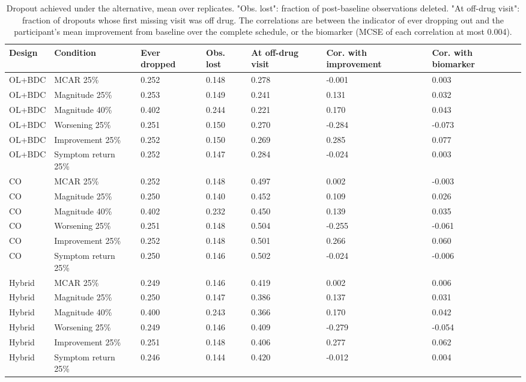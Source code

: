 \documentclass[
  11pt,
]{article}
\begin{document}
\begin{table}

\caption{\label{tab:tab-dropout}Dropout achieved under the alternative, mean over replicates. "Obs. lost": fraction of post-baseline observations deleted. "At off-drug visit": fraction of dropouts whose first missing visit was off drug. The correlations are between the indicator of ever dropping out and the participant's mean improvement from baseline over the complete schedule, or the biomarker (MCSE of each correlation at most 0.004).}
\centering
\begin{tabular}[t]{lllllll}
\toprule
Design & Condition & Ever dropped & Obs. lost & At off-drug visit & Cor. with improvement & Cor. with biomarker\\
\midrule
OL+BDC & MCAR 25\% & 0.252 & 0.148 & 0.278 & -0.001 & 0.003\\
OL+BDC & Magnitude 25\% & 0.253 & 0.149 & 0.241 & 0.131 & 0.032\\
OL+BDC & Magnitude 40\% & 0.402 & 0.244 & 0.221 & 0.170 & 0.043\\
OL+BDC & Worsening 25\% & 0.251 & 0.150 & 0.270 & -0.284 & -0.073\\
OL+BDC & Improvement 25\% & 0.252 & 0.150 & 0.269 & 0.285 & 0.077\\
OL+BDC & Symptom return 25\% & 0.252 & 0.147 & 0.284 & -0.024 & 0.003\\
CO & MCAR 25\% & 0.252 & 0.148 & 0.497 & 0.002 & -0.003\\
CO & Magnitude 25\% & 0.250 & 0.140 & 0.452 & 0.109 & 0.026\\
CO & Magnitude 40\% & 0.402 & 0.232 & 0.450 & 0.139 & 0.035\\
CO & Worsening 25\% & 0.251 & 0.148 & 0.504 & -0.255 & -0.061\\
CO & Improvement 25\% & 0.252 & 0.148 & 0.501 & 0.266 & 0.060\\
CO & Symptom return 25\% & 0.250 & 0.146 & 0.502 & -0.024 & -0.006\\
Hybrid & MCAR 25\% & 0.249 & 0.146 & 0.419 & 0.002 & 0.006\\
Hybrid & Magnitude 25\% & 0.250 & 0.147 & 0.386 & 0.137 & 0.031\\
Hybrid & Magnitude 40\% & 0.400 & 0.243 & 0.366 & 0.170 & 0.042\\
Hybrid & Worsening 25\% & 0.249 & 0.146 & 0.409 & -0.279 & -0.054\\
Hybrid & Improvement 25\% & 0.251 & 0.148 & 0.406 & 0.277 & 0.062\\
Hybrid & Symptom return 25\% & 0.246 & 0.144 & 0.420 & -0.012 & 0.004\\
\bottomrule
\end{tabular}
\end{table}
\end{document}
